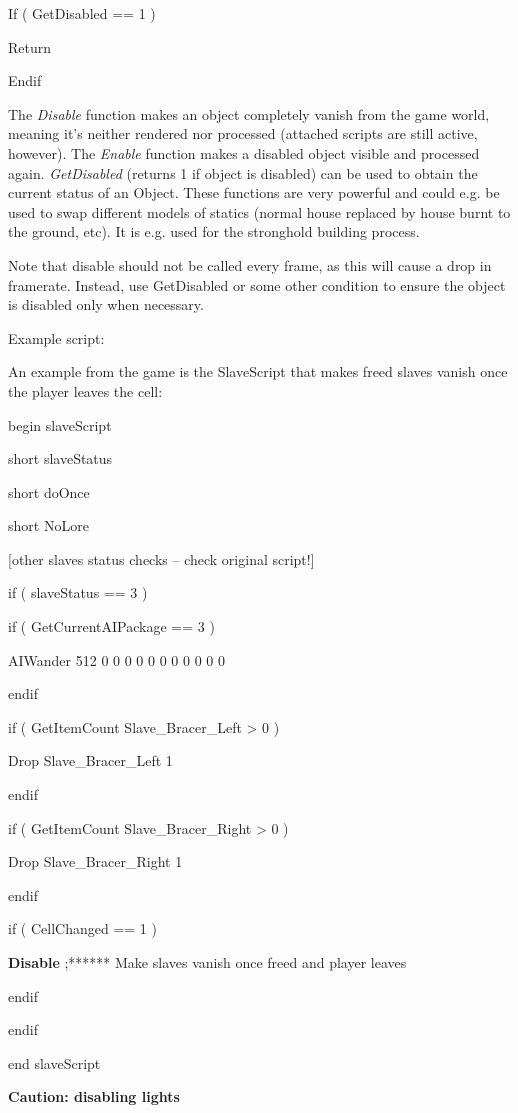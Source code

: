 \documentclass[
]{article}
\begin{document}
If ( GetDisabled == 1 )

Return

Endif

The \emph{Disable} function makes an object completely vanish from the
game world, meaning it's neither rendered nor processed (attached
scripts are still active, however). The \emph{Enable} function makes a
disabled object visible and processed again. \emph{GetDisabled} (returns
1 if object is disabled) can be used to obtain the current status of an
Object. These functions are very powerful and could e.g. be used to swap
different models of statics (normal house replaced by house burnt to the
ground, etc). It is e.g. used for the stronghold building process.

Note that disable should not be called every frame, as this will cause a
drop in framerate. Instead, use GetDisabled or some other condition to
ensure the object is disabled only when necessary.

Example script:

An example from the game is the SlaveScript that makes freed slaves
vanish once the player leaves the cell:

begin slaveScript

short slaveStatus

short doOnce

short NoLore

{[}other slaves status checks -- check original script!{]}

if ( slaveStatus == 3 )

if ( GetCurrentAIPackage == 3 )

AIWander 512 0 0 0 0 0 0 0 0 0 0 0

endif

if ( GetItemCount Slave\_Bracer\_Left \textgreater{} 0 )

Drop Slave\_Bracer\_Left 1

endif

if ( GetItemCount Slave\_Bracer\_Right \textgreater{} 0 )

Drop Slave\_Bracer\_Right 1

endif

if ( CellChanged == 1 )

\textbf{Disable} ;****** Make slaves vanish once freed and player leaves

endif

endif

end slaveScript

\textbf{Caution: disabling lights}
\end{document}
